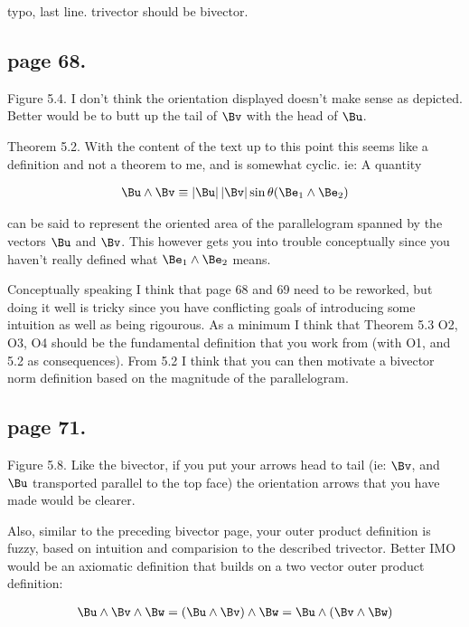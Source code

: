 \documentclass{article}
\begin{document}
typo, last line.  trivector should be bivector.

\subsection{ page 68. }

Figure 5.4.  I don't think the orientation displayed doesn't make sense as depicted.  Better would be to butt up the tail of $\Bv$ with the head of $\Bu$.

Theorem 5.2.  With the content of the text up to this point this seems like a
definition and not a theorem to me, and is somewhat cyclic.  ie: A quantity

\begin{align*}
\Bu \wedge \Bv \equiv \Abs{\Bu} \Abs{\Bv} \sin \theta (\Be_1 \wedge \Be_2)
\end{align*}

can be said to represent the oriented area of the parallelogram spanned by the
vectors $\Bu$ and $\Bv$.  This however gets you into trouble conceptually
since you haven't really defined what $\Be_1 \wedge \Be_2$ means.

Conceptually speaking I think that page 68 and 69 need to be reworked, but
doing it well is tricky since you have conflicting goals of introducing some
intuition as well as being rigourous.  As a minimum I think that Theorem 5.3
O2, O3, O4 should be the fundamental definition that you work from (with O1,
and 5.2 as consequences).  From 5.2 I think that you can then motivate a
bivector norm definition based on the magnitude of the parallelogram.

\subsection{ page 71. }

Figure 5.8.  Like the bivector, if you put your arrows head to tail (ie: $\Bv$, and $\Bu$ transported parallel to the top face) the orientation arrows that
you have made would be clearer.

Also, similar to the preceding bivector page, your outer product definition is 
fuzzy, based on intuition and comparision to the described trivector.  Better
IMO would be an axiomatic definition that builds on a two vector outer product definition:

\begin{align*}
\Bu \wedge \Bv \wedge \Bw &= (\Bu \wedge \Bv) \wedge \Bw = \Bu \wedge (\Bv \wedge \Bw) \\
\end{align*}
\end{document}
